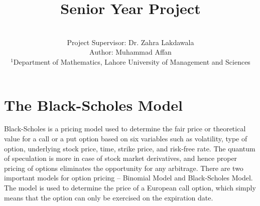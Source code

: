\documentclass[12pt]{article}
\title{Senior Year Project}
\author
{\\
	Project Supervisor: Dr. Zahra Lakdawala
	\\
	Author: Muhammad Affan
	\\
	\normalsize{$^{1}$Department of Mathematics, Lahore University of Management and Sciences}
	\\
}
\date{}
\begin{document}
 
	
	
	\baselineskip24pt
	
	
	\maketitle 
	
	
	

	\newpage	
	\tableofcontents	
	\newpage
		

		

	
	
	
	

	
	
	
	
	\section{The Black-Scholes Model}
	
	Black-Scholes is a pricing model used to determine the fair price or theoretical value for a call or a put option based on six variables such as volatility, type of option, underlying stock price, time, strike price, and risk-free rate. The quantum of speculation is more in case of stock market derivatives, and hence proper pricing of options eliminates the opportunity for any arbitrage. There are two important models for option pricing – Binomial Model and Black-Scholes Model. The model is used to determine the price of a European call option, which simply means that the option can only be exercised on the expiration date.
	
\end{document}
